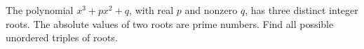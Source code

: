 The polynomial $x^3+px^2+q$, with real $p$ and nonzero $q$, has three distinct integer roots. The absolute values of two roots are prime numbers. Find all possible unordered triples of roots.

